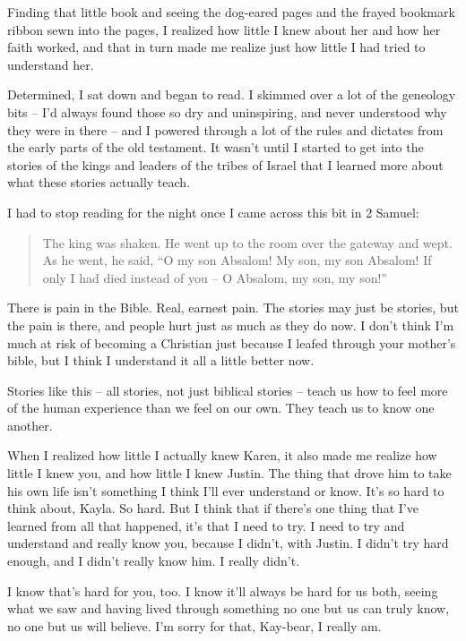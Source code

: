 \begin{itshape}
Finding that little book and seeing the dog-eared pages and the frayed bookmark ribbon sewn into the pages, I realized how little I knew about her and how her faith worked, and that in turn made me realize just how little I had tried to understand her.

Determined, I sat down and began to read.  I skimmed over a lot of the geneology bits -- I'd always found those so dry and uninspiring, and never understood why they were in there -- and I powered through a lot of the rules and dictates from the early parts of the old testament.  It wasn't until I started to get into the stories of the kings and leaders of the tribes of Israel that I learned more about what these stories actually teach.

I had to stop reading for the night once I came across this bit in 2 Samuel:

\begin{quote}
  The king was shaken.  He went up to the room over the gateway and wept.  As he went, he said, ``O my son Absalom! My son, my son Absalom! If only I had died instead of you -- O Absalom, my son, my son!''
\end{quote}

There is pain in the Bible.  Real, earnest pain.  The stories may just be stories, but the pain is there, and people hurt just as much as they do now.  I don't think I'm much at risk of becoming a Christian just because I leafed through your mother's bible, but I think I understand it all a little better now.

Stories like this -- all stories, not just biblical stories -- teach us how to feel more of the human experience than we feel on our own.  They teach us to know one another.

When I realized how little I actually knew Karen, it also made me realize how little I knew you, and how little I knew Justin.  The thing that drove him to take his own life isn't something I think I'll ever understand or know.  It's so hard to think about, Kayla.  So hard.  But I think that if there's one thing that I've learned from all that happened, it's that I need to try.  I need to try and understand and really know you, because I didn't, with Justin.  I didn't try hard enough, and I didn't really know him.  I really didn't.

I know that's hard for you, too.  I know it'll always be hard for us both, seeing what we saw and having lived through something no one but us can truly know, no one but us will believe.  I'm sorry for that, Kay-bear, I really am.


\end{itshape}

